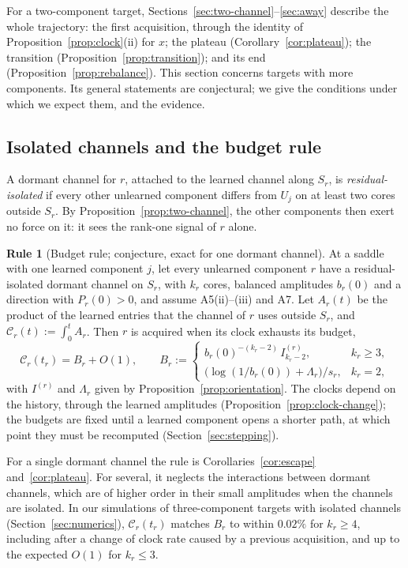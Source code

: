 \documentclass[11pt]{article}
\newcommand{\Clk}{\mathcal{C}}
\theoremstyle{definition}
\newtheorem{budgetrule}[theorem]{Rule}
\numberwithin{equation}{section}
\begin{document}
For a two-component target, Sections~\ref{sec:two-channel}--\ref{sec:away} describe the whole trajectory: the first acquisition, through the identity of Proposition~\ref{prop:clock}(ii) for $x$; the plateau (Corollary~\ref{cor:plateau}); the transition (Proposition~\ref{prop:transition}); and its end (Proposition~\ref{prop:rebalance}). This section concerns targets with more components. Its general statements are conjectural; we give the conditions under which we expect them, and the evidence.

\subsection{Isolated channels and the budget rule}

A dormant channel for $r$, attached to the learned channel along $S_r$, is \emph{residual-isolated} if every other unlearned component differs from $U_j$ on at least two cores outside $S_r$. By Proposition~\ref{prop:two-channel}, the other components then exert no force on it: it sees the rank-one signal of $r$ alone.

\begin{budgetrule}[Budget rule; conjecture, exact for one dormant channel]\label{rule:budget}
At a saddle with one learned component $j$, let every unlearned component $r$ have a residual-isolated dormant channel on $S_r$, with $k_r$ cores, balanced amplitudes $b_r(0)$ and a direction with $P_r(0)>0$, and assume A5(ii)--(iii) and A7. Let $A_r(t)$ be the product of the learned entries that the channel of $r$ uses outside $S_r$, and $\Clk_r(t):=\int_0^tA_r$. Then $r$ is acquired when its clock exhausts its budget,
\begin{equation}\label{eq:budget}
\Clk_r(t_r)=B_r+O(1),\qquad B_r:=\begin{cases}b_r(0)^{-(k_r-2)}\,I^{(r)}_{k_r-2},&k_r\ge3,\\[2pt]\big(\log(1/b_r(0))+\Lambda_r\big)/s_r,&k_r=2,\end{cases}
\end{equation}
with $I^{(r)}$ and $\Lambda_r$ given by Proposition~\ref{prop:orientation}. The clocks depend on the history, through the learned amplitudes (Proposition~\ref{prop:clock-change}); the budgets are fixed until a learned component opens a shorter path, at which point they must be recomputed (Section~\ref{sec:stepping}).
\end{budgetrule}

For a single dormant channel the rule is Corollaries~\ref{cor:escape} and~\ref{cor:plateau}. For several, it neglects the interactions between dormant channels, which are of higher order in their small amplitudes when the channels are isolated. In our simulations of three-component targets with isolated channels (Section~\ref{sec:numerics}), $\Clk_r(t_r)$ matches $B_r$ to within $0.02\%$ for $k_r\ge4$, including after a change of clock rate caused by a previous acquisition, and up to the expected $O(1)$ for $k_r\le3$.
\end{document}
